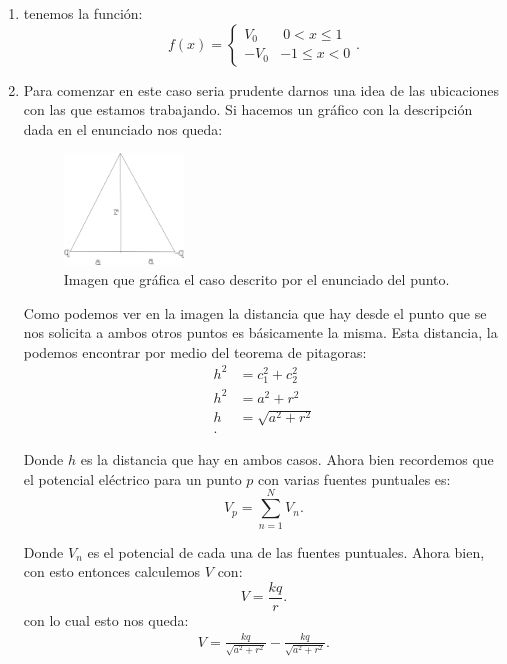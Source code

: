 


    

    \begin{enumerate}
      \item tenemos la función: \[
	  f\left( x \right) =
      \begin{cases}
	V_0 &\ 0 < x \le 1\\
	-V_0 & -1 \le x < 0
      \end{cases}
      .\] 
    \item Para comenzar en este caso seria prudente darnos una idea de las ubicaciones con las que estamos trabajando. Si hacemos un gráfico con la descripción dada en el enunciado nos queda:
      \begin{figure}[h]
        \centering
        \includegraphics[width=0.3\textwidth]{Imagenes/punto_2.png}
        \caption{Imagen que gráfica el caso descrito por el enunciado del punto.}
        \label{fig:punto_2}
      \end{figure}

      Como podemos ver en la imagen \label{fig:punto_2} la distancia que hay desde el punto que se nos solicita a ambos otros puntos es básicamente la misma. Esta distancia, la podemos encontrar por medio del teorema de pitagoras:
      \begin{align*}
        h^2 &= c_1^2 + c_2^2 \\
	h^2 &= a^2 + r^2 \\
	h &= \sqrt{a^2 + r^2}  \\
      .\end{align*}

      Donde $h$ es la distancia que hay en ambos casos. Ahora bien recordemos que el potencial eléctrico para un punto $p$ con varias fuentes puntuales es: \[
	V_p = \displaystyle\sum_{n = 1}^{N} V_n
      .\] 

      Donde $V_n$ es el potencial de cada una de las fuentes puntuales. Ahora bien, con esto entonces calculemos $V$ con:  \[
      V = \frac{kq}{r}
      .\] con lo cual esto nos queda:
      \begin{align*}
        V = \frac{k q}{\sqrt{a^2 + r^2} } - \frac{k q}{\sqrt{a^2 + r^2} }
      .\end{align*}


\end{enumerate}
